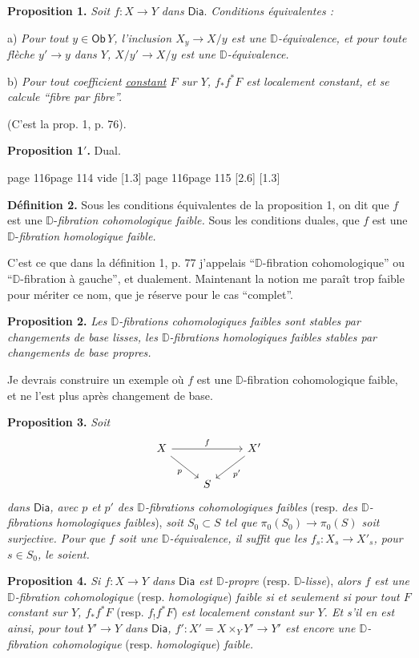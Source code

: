\documentclass[11pt,leqno]{article}
\newcommand{\printedpage}[1]{\marginnote{\scriptsize\sffamily ed.\ #1}}
\newcommand{\msp}[1]{%
  \begingroup\def\thismsp{#1}\def\blankmsp{page 114 vide}%
  \ifx\thismsp\blankmsp
    \marginnote{\scriptsize\sffamily [114: vide]}[1.3\baselineskip]%
  \else\def\followingmsp{page 115}%
    \ifx\thismsp\followingmsp
      \marginnote{\scriptsize\sffamily [page 115]}[2.6\baselineskip]%
    \else\marginnote{\scriptsize\sffamily [#1]}[1.3\baselineskip]\fi
  \fi\endgroup}
\newcommand{\DD}{\ensuremath{\mathbb{D}}}
\newcommand{\Dia}{\ensuremath{\mathsf{Dia}}}
\newcommand{\D}{\ensuremath{\mathbb{D}}}
\begin{document}
\textbf{Proposition 1.} \textit{Soit $f : X \to Y$ dans} \Dia. \textit{Conditions équivalentes :}

a) \textit{Pour tout $y \in \mathsf{Ob}\, Y$, l'inclusion $X_y \to X/y$ est une $\DD$-équivalence, et pour toute flèche $y' \to y$ dans $Y$, $X/y' \to X/y$ est une $\DD$-équivalence.}

b) \textit{Pour tout coefficient \underline{constant} $F$ sur $Y$, $f_{*}f^{*}F$ est localement constant, et se calcule “fibre par fibre”.}

(C'est la prop. 1, p. 76).

\textbf{Proposition 1$'$.} Dual.

\msp{page 116}

\textbf{Définition 2.} Sous les conditions équivalentes de la proposition 1, on dit que $f$ est une $\DD$-\textit{fibration cohomologique faible.} Sous les conditions duales, que $f$ est une $\DD$-\textit{fibration homologique faible.}

C'est ce que dans la définition 1, p. 77 j'appelais “$\DD$-fibration cohomologique” ou “$\DD$-fibration à gauche”, et dualement. Maintenant la notion me paraît trop faible pour mériter ce nom, que je réserve pour le cas “complet”.

\textbf{Proposition 2.} \textit{Les $\DD$-fibrations cohomologiques faibles sont stables par changements de base lisses, les $\DD$-fibrations homologiques faibles stables par changements de base propres.}

Je devrais construire un exemple où $f$ est une $\DD$-fibration cohomologique faible, et ne l'est plus après changement de base.

\printedpage{69}

\textbf{Proposition 3.} \textit{Soit}
\[
\begin{tikzcd}
X \arrow[rr, "f"] \arrow[dr, "p"'] & & X' \arrow[dl, "p'"] \\
& S &
\end{tikzcd}
\]
\textit{dans \Dia, avec $p$ et $p'$ des $\D$-fibrations cohomologiques faibles} (resp. \textit{des $\D$-fibrations homologiques faibles}), \textit{soit $S_0 \subset S$ tel que $\pi_0(S_0) \to \pi_0(S)$ soit surjective. Pour que $f$ soit une $\D$-équivalence, il suffit que les $f_s : X_s \to X'_s$, pour $s \in S_0$, le soient.}

\textbf{Proposition 4.} \textit{Si $f : X \to Y$ dans \Dia{} est $\D$-propre} (resp. $\D$-\textit{lisse}), \textit{alors $f$ est une $\D$-fibration cohomologique} (resp. \textit{homologique}) \textit{faible si et seulement si pour tout $F$ constant sur $Y$, $f_*f^*F$} (resp. $f_!f^*F$) \textit{est localement constant sur $Y$. Et s'il en est ainsi, pour tout $Y' \to Y$ dans \Dia, $f' : X' = X \times_Y Y' \to Y'$ est encore une $\D$-fibration cohomologique} (resp. \textit{homologique}) \textit{faible.}
\end{document}
